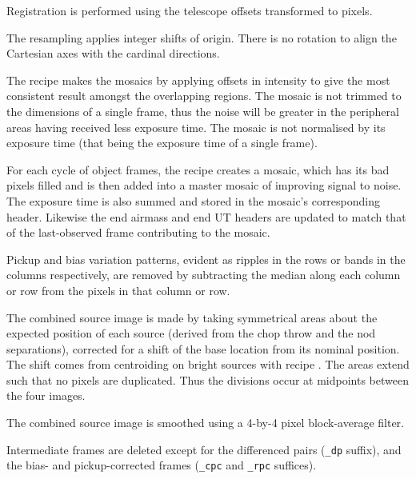 \documentclass[twoside,11pt,nolof]{starlink}
\begin{document}
{{{         \sstitem
         Registration is performed using the telescope offsets
         transformed to pixels.

         \sstitem
         The resampling applies integer shifts of origin.   There is no
         rotation to align the Cartesian axes with the cardinal directions.

         \sstitem
         The recipe makes the mosaics by applying offsets in intensity
         to give the most consistent result amongst the overlapping regions.
         The mosaic is not trimmed to the dimensions of a single frame, thus
         the noise will be greater in the peripheral areas having received
         less exposure time.  The mosaic is not normalised by its exposure
         time (that being the exposure time of a single frame).

         \sstitem
         For each cycle of object frames, the recipe creates a mosaic,
         which has its bad pixels filled and is then added into a master
         mosaic of improving signal to noise.  The exposure time is also
         summed and stored in the mosaic's corresponding header.  Likewise
         the end airmass and end UT headers are updated to match that of the
         last-observed frame contributing to the mosaic.

         \sstitem
         Pickup and bias variation patterns, evident as ripples in the
         rows or bands in the columns respectively, are removed by
         subtracting the median along each column or row from the pixels
         in that column or row.

         \sstitem
         The combined source image is made by taking symmetrical areas
         about the expected position of each source (derived from the
         chop throw and the nod separations), corrected for a shift
         of the base location from its nominal position.  The shift comes
         from centroiding on bright sources with recipe
         .
         The areas extend such that no pixels are duplicated.  Thus the
         divisions occur at midpoints between the four images.

         \sstitem
         The combined source image is smoothed using a 4-by-4 pixel
         block-average filter.

         \sstitem
         Intermediate frames are deleted except for the differenced pairs
         ({\tt\_dp} suffix), and the bias- and pickup-corrected frames
         ({\tt\_cpc} and {\tt\_rpc} suffices).
      }
   }
   }
\end{document}

